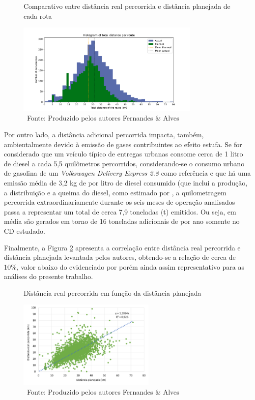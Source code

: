 \begin{figure}[ht]
    \centering
    \caption{Comparativo entre distância real percorrida e distância planejada de cada rota}
    \includegraphics[width=0.8\textwidth]{images/5_emp_bebidas/excel_based/distances_histogram.pdf} 
    \caption*{\ Fonte: Produzido pelos autores Fernandes \& Alves}
    \label{fig:DistPlan_vs_distReal}
\end{figure}

Por outro lado, a distância adicional percorrida impacta, também, ambientalmente devido à emissão de gases contribuintes ao efeito estufa.
Se for considerado que um veículo típico de entregas urbanas consome cerca de 1 litro de diesel a cada 5,5 quilômetros percorridos, considerando-se o consumo urbano de gasolina de um \textit{Volkswagen Delivery Express 2.8} como referência  e que há uma emissão média de 3,2 kg de  por litro de diesel consumido (que inclui a produção, a distribuição e a queima do diesel, como estimado por , a quilometragem percorrida extraordinariamente durante os seis meses de operação analisados passa a representar um total de cerca 7,9 toneladas (t)  emitidos.
Ou seja, em média são gerados em torno de 16 toneladas adicionais de  por ano somente no CD estudado.

Finalmente, a Figura \ref{fig:DistPlan_vs_distReal_CORRELACAO} apresenta a correlação entre distância real percorrida e distância planejada levantada pelos autores, obtendo-se a relação de cerca de 10\%, valor abaixo do evidenciado por  porém ainda assim representativo para as análises do presente trabalho.

\begin{figure}[ht]
    \centering
    \caption{Distância real percorrida em função da distância planejada}
    \includegraphics[width=0.6\textwidth]{images/5_emp_bebidas/excel_based/dist_plan_vs_real.png} 
    \caption*{\ Fonte: Produzido pelos autores Fernandes \& Alves}
    \label{fig:DistPlan_vs_distReal_CORRELACAO}
\end{figure}

